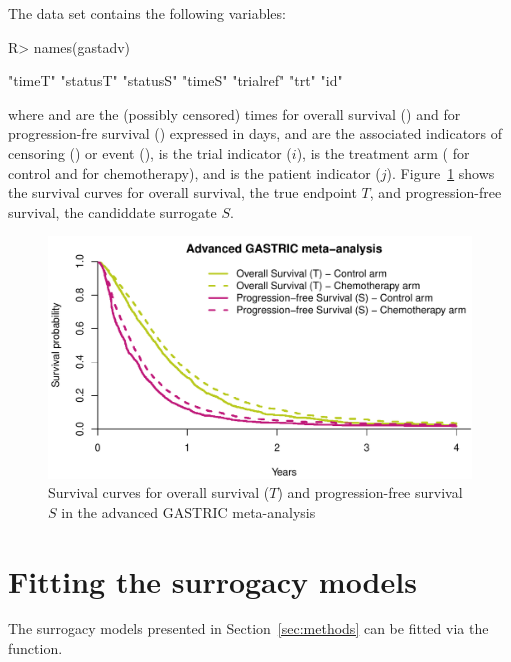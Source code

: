 \documentclass[article,shortnames, nojss]{jss}\usepackage[]{graphicx}\usepackage[]{color}
\begin{document}
The data set contains the following variables:
\begin{Schunk}
\begin{Sinput}
R> names(gastadv)
\end{Sinput}
\begin{Soutput}
[1] "timeT"    "statusT"  "statusS"  "timeS"    "trialref" "trt"      "id"      
\end{Soutput}
\end{Schunk}
where  and  are the (possibly censored) times 
for overall survival () and
for progression-fre survival () expressed in days,
 and  are the associated indicators of
censoring () or event (),
 is the trial indicator ($i$),
 is the treatment arm ( for control and  for chemotherapy),
and  is the patient indicator ($j$).
Figure~\ref{fig:survCurves} shows the survival curves for overall survival,
the true endpoint $T$, and progression-free survival,
the candiddate surrogate $S$.
\begin{Schunk}
\begin{figure}
\includegraphics[width=\textwidth]{figure/survCurves-1} \caption[Survival curves for overall survival ($T$) and progression-free survival $S$ in the advanced GASTRIC meta-analysis \citep{GASTRIC13}]{Survival curves for overall survival ($T$) and progression-free survival $S$ in the advanced GASTRIC meta-analysis \citep{GASTRIC13}}\label{fig:survCurves}
\end{figure}
\end{Schunk}

  
\section{Fitting the surrogacy models}
  The surrogacy models presented in Section~\ref{sec:methods}
  can be fitted via the  function.
  
\end{document}
